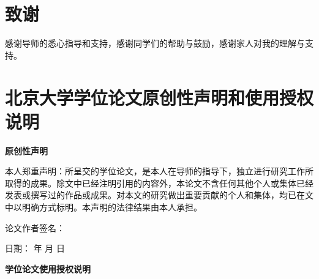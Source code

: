 \documentclass[12pt, a4paper]{ctexart}
\begin{document}




\newpage
\section{致谢}

感谢导师的悉心指导和支持，感谢同学们的帮助与鼓励，感谢家人对我的理解与支持。

\newpage
\section{北京大学学位论文原创性声明和使用授权说明}

\vspace{1em} %

\begin{center}
    \textbf{原创性声明}
\end{center}

\vspace{1em} %

本人郑重声明：所呈交的学位论文，是本人在导师的指导下，独立进行研究工作所取得的成果。除文中已经注明引用的内容外，本论文不含任何其他个人或集体已经发表或撰写过的作品或成果。对本文的研究做出重要贡献的个人和集体，均已在文中以明确方式标明。本声明的法律结果由本人承担。

\vspace{4em} %

\hfill 论文作者签名：\underline{\hspace{3cm}} 

\vspace{2em} %

\hfill 日期：\underline{\hspace{2cm}} 年 \underline{\hspace{1cm}} 月 \underline{\hspace{1cm}} 日

\vspace{2em} %

\begin{center}
    \textbf{学位论文使用授权说明}
\end{center}

\vspace{1em} %
\end{document}
